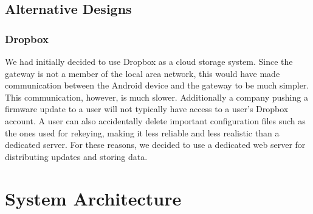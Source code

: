 \documentclass[11pt]{article}
\begin{document}
\FloatBarrier


\subsection{Alternative Designs}

\subsubsection{Dropbox}
We had initially decided to use Dropbox as a cloud storage system. Since the gateway is not a member of the local area network, this would have made communication between the Android device and the gateway to be much simpler. This communication, however, is much slower. Additionally a company pushing a firmware update to a user will not typically have access to a user's Dropbox account. A user can also accidentally delete important configuration files such as the ones used for rekeying, making it less reliable and less realistic than a dedicated server. For these reasons, we decided to use a dedicated web server for distributing updates and storing data. 


\section{System Architecture}
\end{document}
